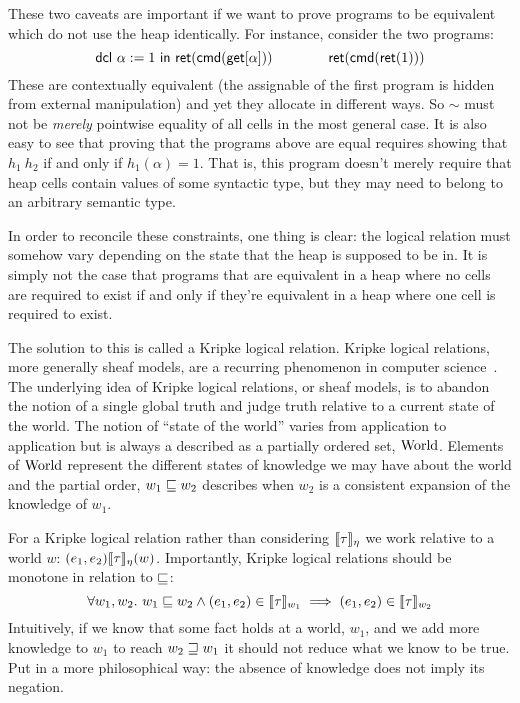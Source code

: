 These two caveats are important if we want to prove programs to be
equivalent which do not use the heap identically. For instance,
consider the two programs:
\[
  \mathsf{dcl}\ \alpha := 1\ \mathsf{in}\ \mathsf{ret}(\mathsf{cmd}(\mathsf{get}[\alpha])) \qquad\qquad
  \mathsf{ret}(\mathsf{cmd}(\mathsf{ret}(1)))
\]
These are contextually equivalent (the assignable of the first program
is hidden from external manipulation) and yet they allocate in
different ways. So $\sim$ must not be \emph{merely} pointwise equality
of all cells in the most general case. It is also easy to see that
proving that the programs above are equal requires showing that
$h_1 ~ h_2$ if and only if $h_1(\alpha) = 1$. That is, this program
doesn't merely require that heap cells contain values of some
syntactic type, but they may need to belong to an arbitrary semantic
type.

In order to reconcile these constraints, one thing is clear: the
logical relation must somehow vary depending on the state that the
heap is supposed to be in. It is simply not the case that programs
that are equivalent in a heap where no cells are required to exist if
and only if they're equivalent in a heap where one cell is required to
exist.

The solution to this is called a Kripke logical relation. Kripke
logical relations, more generally sheaf models, are a recurring
phenomenon in computer
science~\citep{Plotkin:80,Mitchell:91,Appel:01,Ahmed:04}. The
underlying idea of Kripke logical relations, or sheaf models, is to
abandon the notion of a single global truth and judge truth relative
to a current state of the world. The notion of ``state of the world''
varies from application to application but is always a described as
a partially ordered set, $\mathrm{World}$. Elements of $\mathrm{World}$ represent
the different states of knowledge we may have about the world and the
partial order, $w_1 \mathrel{\sqsubseteq} w_2$ describes when $w_2$ is a consistent
expansion of the knowledge of $w_1$.

For a Kripke logical relation rather than considering
$\llbracket \tau \rrbracket_\eta$ we work relative to a world $w$:
$(e_1, e_2) \llbracket \tau \rrbracket_\eta(w)$. Importantly, Kripke logical relations
should be monotone in relation to $\mathrel{\sqsubseteq}$:
\[
  \forall w_1, w_2.
  \ w_1 \mathrel{\sqsubseteq} w_2 \land (e_1, e_2) \in \llbracket \tau \rrbracket_{w_1}
  \implies (e_1, e_2) \in \llbracket \tau \rrbracket_{w_2}
\]
Intuitively, if we know that some fact holds at a world, $w_1$, and we
add more knowledge to $w_1$ to reach $w_2 \mathrel{\sqsupseteq} w_1$ it should not
reduce what we know to be true. Put in a more philosophical way: the
absence of knowledge does not imply its negation.

